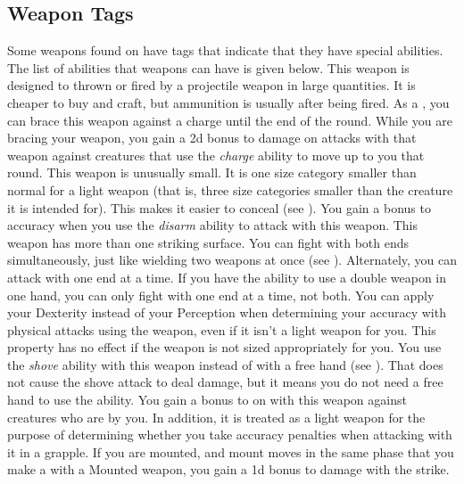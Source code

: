     \subsection{Weapon Tags}\label{Weapon Tags}
        Some weapons found on  have tags that indicate that they have special abilities. The list of abilities that weapons can have is given below.
         This weapon is designed to thrown or fired by a projectile weapon in large quantities. It is cheaper to buy and craft, but ammunition is usually  after being fired.
         As a , you can brace this weapon against a charge until the end of the round.
        While you are bracing your weapon, you gain a \plus2d bonus to damage on attacks with that weapon against creatures that use the \textit{charge} ability to move up to you that round.
         This weapon is unusually small. It is one size category smaller than normal for a light weapon (that is, three size categories smaller than the creature it is intended for). This makes it easier to conceal (see ).
         You gain a  bonus to accuracy when you use the \textit{disarm} ability to attack with this weapon.
         This weapon has more than one striking surface. You can fight with both ends simultaneously, just like wielding two weapons at once (see ). Alternately, you can attack with one end at a time. If you have the ability to use a double weapon in one hand, you can only fight with one end at a time, not both.
         You can apply your Dexterity instead of your Perception when determining your accuracy with physical attacks using the weapon, even if it isn't a light weapon for you.
        This property has no effect if the weapon is not sized appropriately for you.
         You use the \textit{shove} ability with this weapon instead of with a free hand (see ).
        That does not cause the shove attack to deal damage, but it means you do not need a free hand to use the ability.
         You gain a  bonus to  on  with this weapon against creatures who are  by you.
        In addition, it is treated as a light weapon for the purpose of determining whether you take accuracy penalties when attacking with it in a grapple.
        \label{Mounted Weapon} If you are mounted, and mount moves in the same phase that you make a  with a Mounted weapon, you gain a \plus1d bonus to damage with the strike.
